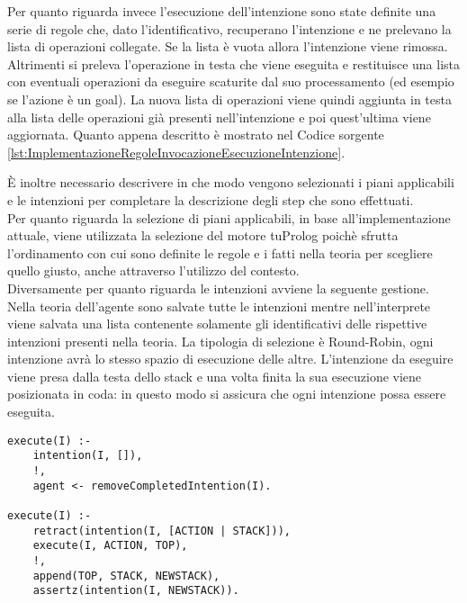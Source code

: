 Per quanto riguarda invece l'esecuzione dell'intenzione sono state definite una serie di regole che, dato l'identificativo, recuperano l'intenzione e ne prelevano la lista di operazioni collegate. Se la lista è vuota allora l'intenzione viene rimossa. Altrimenti si preleva l'operazione in testa che viene eseguita e restituisce una lista con eventuali operazioni da eseguire scaturite dal suo processamento (ed esempio se l'azione è un goal). La nuova lista di operazioni viene quindi aggiunta in testa alla lista delle operazioni già presenti nell'intenzione e poi quest'ultima viene aggiornata. Quanto appena descritto è mostrato nel Codice sorgente \ref{lst:ImplementazioneRegoleInvocazioneEsecuzioneIntenzione}.

\`E inoltre necessario descrivere in che modo vengono selezionati i piani applicabili e le intenzioni per completare la descrizione degli step che sono effettuati.
\\
Per quanto riguarda la selezione di piani applicabili, in base all'implementazione attuale, viene utilizzata la selezione del motore tuProlog poichè sfrutta l'ordinamento con cui sono definite le regole e i fatti nella teoria per scegliere quello giusto, anche attraverso l'utilizzo del contesto.
\\
Diversamente per quanto riguarda le intenzioni avviene la seguente gestione. Nella teoria dell'agente sono salvate tutte le intenzioni mentre nell'interprete viene salvata una lista contenente solamente gli identificativi delle rispettive intenzioni presenti nella teoria. La tipologia di selezione è Round-Robin, ogni intenzione avrà lo stesso spazio di esecuzione delle altre. L'intenzione da eseguire viene presa dalla testa dello stack e una volta finita la sua esecuzione viene posizionata in coda: in questo modo si assicura che ogni intenzione possa essere eseguita.

\medskip
\begin{lstlisting}[firstnumber=1,label={lst:ImplementazioneRegoleInvocazioneEsecuzioneIntenzione},caption={Implementazione regole per invocazione esecuzione di un'intenzione}]
execute(I) :-
    intention(I, []),
    !,
    agent <- removeCompletedIntention(I).

execute(I) :-
    retract(intention(I, [ACTION | STACK])),
    execute(I, ACTION, TOP),
    !,
    append(TOP, STACK, NEWSTACK),
    assertz(intention(I, NEWSTACK)).
\end{lstlisting}

